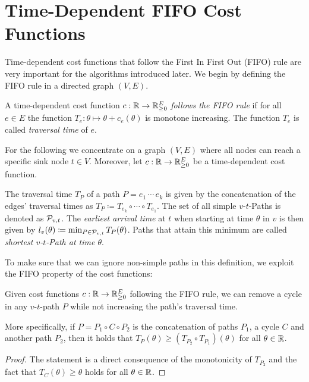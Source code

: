 \section{Time-Dependent FIFO Cost Functions}

Time-dependent cost functions that follow the First In First Out (FIFO) rule are very important for the algorithms introduced later.
We begin by defining the FIFO rule in a directed graph $(V, E)$.


\begin{definition}
    A time-dependent cost function $c: \mathbb{R}\rightarrow \mathbb{R}_{\geq0}^E$ \emph{follows the FIFO rule} if for all $e\in E$ the function $T_e: \theta\mapsto \theta + c_e(\theta)$ is monotone increasing.
    The function $T_e$ is called \emph{traversal time} of $e$.
\end{definition}

For the following we concentrate on a graph $(V,E)$ where all nodes can reach a specific sink node $t\in V$.
Moreover, let $c:\mathbb{R}\rightarrow \mathbb{R}_{\geq0}^E$ be a time-dependent cost function.

The traversal time $T_P$ of a path $P = e_1\,\cdots\,e_k$ is given by the concatenation of the edges' traversal times as $T_P \coloneqq T_{e_k} \circ \cdots \circ T_{e_1}$.
The set of all simple $v$-$t$-Paths is denoted as $\mathcal{P}_{v,t}$.
The \emph{earliest arrival time} at $t$ when starting at time $\theta$ in $v$ is then given by $l_v(\theta)\coloneqq \min_{P\in\mathcal{P}_{v,t}} T_P(\theta)$.
Paths that attain this minimum are called \emph{shortest $v$-$t$-Path at time $\theta$}.

To make sure that we can ignore non-simple paths in this definition, we exploit the FIFO property of the cost functions:

\begin{proposition}\label{prop:removing-cycles-in-fifo-graphs}
    Given cost functions $c:\mathbb{R}\rightarrow\mathbb{R}_{\geq0}^E$ following the FIFO rule, we can remove a cycle in any $v$-$t$-path $P$ while not increasing the path's traversal time.

    More specifically, if $P=P_1\circ C \circ P_2$ is the concatenation of paths $P_1$, a cycle $C$ and another path $P_2$, then it holds that $
        T_P(\theta) \geq \left(
        T_{P_2} \circ T_{P_1} \right)(\theta)$ for all $\theta\in\mathbb{R}$.
\end{proposition}
\begin{proof}
The statement is a direct consequence of the monotonicity of $T_{P_2}$ and the fact that $T_C(\theta) \geq \theta$ holds for all $\theta\in\mathbb{R}$.
\end{proof}

